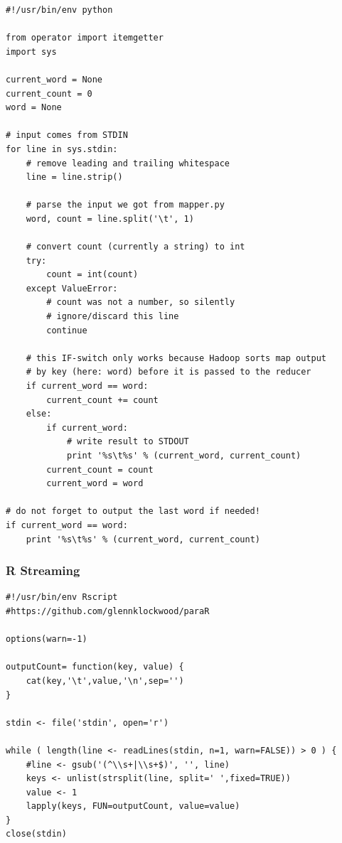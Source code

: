\documentclass[
journal=jacsat, %
manuscript=article]{achemso}
\begin{document}
\begin{lstlisting}[caption=Reducer.py]
#!/usr/bin/env python

from operator import itemgetter
import sys

current_word = None
current_count = 0
word = None

# input comes from STDIN
for line in sys.stdin:
    # remove leading and trailing whitespace
    line = line.strip()

    # parse the input we got from mapper.py
    word, count = line.split('\t', 1)

    # convert count (currently a string) to int
    try:
        count = int(count)
    except ValueError:
        # count was not a number, so silently
        # ignore/discard this line
        continue

    # this IF-switch only works because Hadoop sorts map output
    # by key (here: word) before it is passed to the reducer
    if current_word == word:
        current_count += count
    else:
        if current_word:
            # write result to STDOUT
            print '%s\t%s' % (current_word, current_count)
        current_count = count
        current_word = word

# do not forget to output the last word if needed!
if current_word == word:
    print '%s\t%s' % (current_word, current_count)
\end{lstlisting}

\subsubsection{R Streaming}
\begin{lstlisting}[caption=Mapper.R]
#!/usr/bin/env Rscript
#https://github.com/glennklockwood/paraR

options(warn=-1)

outputCount= function(key, value) {
    cat(key,'\t',value,'\n',sep='')
}

stdin <- file('stdin', open='r')

while ( length(line <- readLines(stdin, n=1, warn=FALSE)) > 0 ) {
    #line <- gsub('(^\\s+|\\s+$)', '', line)
    keys <- unlist(strsplit(line, split=' ',fixed=TRUE))
    value <- 1
    lapply(keys, FUN=outputCount, value=value)
}
close(stdin)

\end{lstlisting}
\end{document}
